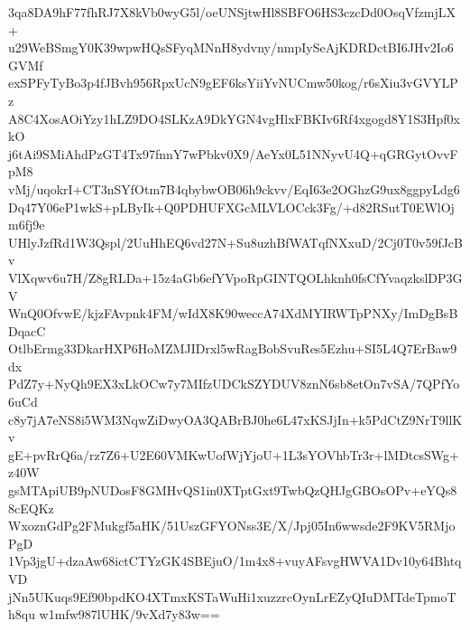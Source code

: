 3qa8DA9hF77fhRJ7X8kVb0wyG5l/oeUNSjtwHl8SBFO6HS3czcDd0OsqVfzmjLX+
u29WeBSmgY0K39wpwHQsSFyqMNnH8ydvny/nmpIySeAjKDRDctBI6JHv2Io6GVMf
exSPFyTyBo3p4fJBvh956RpxUcN9gEF6ksYiiYvNUCmw50kog/r6sXiu3vGVYLPz
A8C4XosAOiYzy1hLZ9DO4SLKzA9DkYGN4vgHlxFBKIv6Rf4xgogd8Y1S3Hpf0xkO
j6tAi9SMiAhdPzGT4Tx97fnnY7wPbkv0X9/AeYx0L51NNyvU4Q+qGRGytOvvFpM8
vMj/uqokrI+CT3nSYfOtm7B4qbybwOB06h9ckvv/EqI63e2OGhzG9ux8ggpyLdg6
Dq47Y06eP1wkS+pLByIk+Q0PDHUFXGcMLVLOCck3Fg/+d82RSutT0EWlOjm6fj9e
UHlyJzfRd1W3Qspl/2UuHhEQ6vd27N+Su8uzhBfWATqfNXxuD/2Cj0T0v59fJcBv
VlXqwv6u7H/Z8gRLDa+15z4aGb6efYVpoRpGINTQOLhknh0fsCfYvaqzkslDP3GV
WnQ0OfvwE/kjzFAvpnk4FM/wIdX8K90weccA74XdMYIRWTpPNXy/ImDgBsBDqacC
OtlbErmg33DkarHXP6HoMZMJIDrxl5wRagBobSvuRes5Ezhu+SI5L4Q7ErBaw9dx
PdZ7y+NyQh9EX3xLkOCw7y7MIfzUDCkSZYDUV8znN6sb8etOn7vSA/7QPfYo6uCd
c8y7jA7eNS8i5WM3NqwZiDwyOA3QABrBJ0he6L47xKSJjIn+k5PdCtZ9NrT9llKv
gE+pvRrQ6a/rz7Z6+U2E60VMKwUofWjYjoU+1L3sYOVhbTr3r+lMDtcsSWg+z40W
gsMTApiUB9pNUDosF8GMHvQS1in0XTptGxt9TwbQzQHJgGBOsOPv+eYQs88cEQKz
WxoznGdPg2FMukgf5aHK/51UszGFYONss3E/X/Jpj05In6wwsde2F9KV5RMjoPgD
1Vp3jgU+dzaAw68ictCTYzGK4SBEjuO/1m4x8+vuyAFsvgHWVA1Dv10y64BhtqVD
jNn5UKuqs9Ef90bpdKO4XTmxKSTaWuHi1xuzzrcOynLrEZyQIuDMTdeTpmoTh8qu
w1mfw987lUHK/9vXd7y83w==
